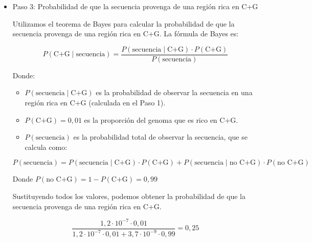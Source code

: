 \begin{itemize}
\item Paso 3: Probabilidad de que la secuencia provenga de una región rica en C+G

Utilizamos el teorema de Bayes para calcular la probabilidad de que la secuencia provenga de una región rica en C+G. La fórmula de Bayes es:

\[
P(\text{C+G} \mid \text{secuencia}) = \frac{P(\text{secuencia} \mid \text{C+G}) \cdot P(\text{C+G})}{P(\text{secuencia})}
\]

Donde:
\begin{itemize}
\item $ P(\text{secuencia} \mid \text{C+G}) $ es la probabilidad de observar la secuencia en una región rica en C+G (calculada en el Paso 1).
\item $ P(\text{C+G}) = 0,01 $ es la proporción del genoma que es rico en C+G.
\item $ P(\text{secuencia}) $ es la probabilidad total de observar la secuencia, que se calcula como:
\end{itemize}

\[
P(\text{secuencia}) = P(\text{secuencia} \mid \text{C+G}) \cdot P(\text{C+G}) + P(\text{secuencia} \mid \text{no C+G}) \cdot P(\text{no C+G})
\]

Donde $ P(\text{no C+G}) = 1 - P(\text{C+G}) = 0,99 $

Sustituyendo todos los valores, podemos obtener la probabilidad de que la secuencia provenga de una región rica en C+G.

\[
\frac{1,2 \cdot 10^{-7} \cdot 0,01}{1,2 \cdot 10^{-7} \cdot 0,01 + 3,7 \cdot 10^{-9} \cdot 0,99} = 0,25
\]

\end{itemize}